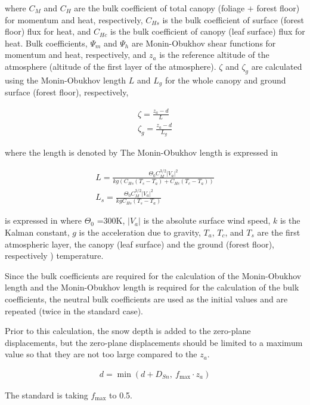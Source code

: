where \(C_M\) and \(C_H\) are the bulk coefficient of total canopy
(foliage \(+\) forest floor) for momentum and heat, respectively,
\(C_{Hs}\) is the bulk coefficient of surface (forest floor) flux for
heat, and \(C_{Hc}\) is the bulk coefficient of canopy (leaf surface)
flux for heat. Bulk coefficients, \(\Psi_m\) and \(\Psi_h\) are
Monin-Obukhov shear functions for momentum and heat, respectively, and
\(z_a\) is the reference altitude of the atmosphere (altitude of the
first layer of the atmosphere). \(\zeta\) and \(\zeta_g\) are calculated
using the Monin-Obukhov length \(L\) and \(L_g\) for the whole canopy
and ground surface (forest floor), respectively,

\begin{eqnarray}
 \zeta = \frac{z_a - d}{L} \\
 \zeta_g = \frac{z_a - d}{L_g}
\end{eqnarray}

where the length is denoted by The Monin-Obukhov length is expressed in

\begin{eqnarray}
 L = \frac{\Theta_0 C_M^{3/2}|V_a|^2}{kg(C_{Hs}(T_s - T_a) + C_{Hc}(T_c - T_a))} \\
 L_s = \frac{\Theta_0 C_M^{3/2}|V_a|^2}{kg C_{Hs}(T_s - T_a)}
\end{eqnarray}

is expressed in where \(\Theta_0\) =300K, \(|V_a|\) is the absolute
surface wind speed, \(k\) is the Kalman constant, \(g\) is the
acceleration due to gravity, \(T_a\), \(T_c\), and \(T_s\) are the first
atmospheric layer, the canopy (leaf surface) and the ground (forest
floor), respectively ) temperature.

Since the bulk coefficients are required for the calculation of the
Monin-Obukhov length and the Monin-Obukhov length is required for the
calculation of the bulk coefficients, the neutral bulk coefficients are
used as the initial values and are repeated (twice in the standard
case).

Prior to this calculation, the snow depth is added to the zero-plane
displacements, but the zero-plane displacements should be limited to a
maximum value so that they are not too large compared to the \(z_a\).

\begin{eqnarray}
 d = \min( d + D_{Sn} ,\  f_{\max} \cdot z_a )
\end{eqnarray}

The standard is taking \(f_{\max}\) to 0.5.

